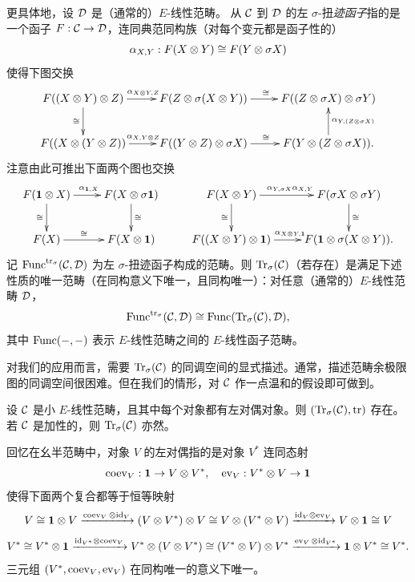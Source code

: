 更具体地，设 ${\mathcal D}$ 是（通常的）$E$-线性范畴。
从 ${\mathcal C}$ 到 ${\mathcal D}$ 的左 $\sigma$-扭\emph{迹函子}指的是一个函子 $F:{\mathcal C}\to{\mathcal D}$，连同典范同构族（对每个变元都是函子性的）
\[{\alpha}_{X,Y}: F(X\otimes Y)\cong F(Y\otimes \sigma X)\]
使得下图交换
\begin{equation}
\label{E:cond trace}
\xymatrix{
F((X\otimes Y)\otimes Z)\ar^{\al_{X\otimes Y,Z}}[r]\ar_\cong[d] & F(Z\otimes \sigma (X\otimes Y))\ar^{\cong}[r]&  F((Z\otimes \sigma X)\otimes \sigma Y)  \\
F((X\otimes (Y\otimes Z))\ar^{\al_{X,Y\otimes Z}}[r] & F((Y\otimes Z)\otimes \sigma X)\ar^{\cong}[r]&  F(Y\otimes (Z\otimes \sigma X)). \ar_{\al_{Y,(Z\otimes\sigma X)}}[u]
}
\end{equation}
注意由此可推出下面两个图也交换
\begin{equation}
\label{E:cond trace cor}
\xymatrix{
F(\mathbf{1}\otimes X)\ar_{\cong}[d]\ar^{\al_{\mathbf{1},X}}[r]& F(X\otimes \sigma\mathbf{1})\ar^\cong[d]&  F(X\otimes Y)\ar^{\al_{Y,\sigma X}\al_{X,Y}}[r]\ar_\cong[d]& F(\sigma X\otimes \sigma Y)\ar^\cong[d]\\
 F(X)\ar^-\cong[r]& F(X\otimes \mathbf{1})&  F((X\otimes Y)\otimes\mathbf{1})\ar^{\al_{X\otimes Y,\mathbf{1}}} [r]& F(\mathbf{1}\otimes\sigma(X\otimes Y)).
}\end{equation}
记 $\operatorname{Func}^{{\operatorname{tr}}_\sigma}({\mathcal C},{\mathcal D})$ 为左 $\sigma$-扭迹函子构成的范畴。则 ${\operatorname{Tr}}_\sigma({\mathcal C})$（若存在）是满足下述性质的唯一范畴（在同构意义下唯一，且同构唯一）：对任意（通常的）$E$-线性范畴 ${\mathcal D}$，
\[\operatorname{Func}^{{\operatorname{tr}}_\sigma}({\mathcal C},{\mathcal D})\cong \operatorname{Func}({\operatorname{Tr}}_\sigma({\mathcal C}),{\mathcal D}),\]
其中 $\operatorname{Func}(-,-)$ 表示 $E$-线性范畴之间的 $E$-线性函子范畴。

对我们的应用而言，需要 ${\operatorname{Tr}}_\sigma({\mathcal C})$ 的同调空间的显式描述。通常，描述范畴余极限图的同调空间很困难。但在我们的情形，对 ${\mathcal C}$ 作一点温和的假设即可做到。
\begin{prop}
\label{L:trace cat}
设 ${\mathcal C}$ 是小 $E$-线性范畴，且其中每个对象都有左对偶对象。则 $({\operatorname{Tr}}_\sigma({\mathcal C}),{\operatorname{tr}})$ 存在。若 ${\mathcal C}$ 是加性的，则 ${\operatorname{Tr}}_\sigma({\mathcal C})$ 亦然。
\end{prop}
回忆在幺半范畴中，对象 $V$ 的左对偶指的是对象 $V^*$ 连同态射
$$\operatorname{coev}_V:\mathbf{1}\to V\otimes V^*,\quad \operatorname{ev}_V: V^*\otimes V\to \mathbf{1}$$
使得下面两个复合都等于恒等映射
\[V\cong \mathbf{1}\otimes V\xrightarrow{\operatorname{coev}_V\otimes{\operatorname{id}}_{V}}(V\otimes V^*)\otimes V\cong V\otimes (V^*\otimes V)\xrightarrow{{\operatorname{id}}_{V}\otimes\operatorname{ev}_V}V\otimes\mathbf{1}\cong V\]
\[V^*\cong V^*\otimes\mathbf{1}\xrightarrow{{\operatorname{id}}_{V^*}\otimes\operatorname{coev}_V} V^*\otimes (V\otimes V^*)\cong (V^*\otimes V)\otimes V^*\xrightarrow{\operatorname{ev}_V\otimes{\operatorname{id}}_{V^*}}\mathbf{1}\otimes V^*\cong V^*.\]
三元组 $(V^*,\operatorname{coev}_V,\operatorname{ev}_V)$ 在同构唯一的意义下唯一。
